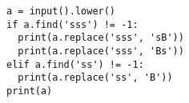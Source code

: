 \documentclass[varwidth=6cm]{standalone}
\begin{document}
\begin{verbatim}
a = input().lower()
if a.find('sss') != -1:
  print(a.replace('sss', 'sB'))
  print(a.replace('sss', 'Bs'))
elif a.find('ss') != -1:
  print(a.replace('ss', 'B'))
print(a)
\end{verbatim}
\end{document}
